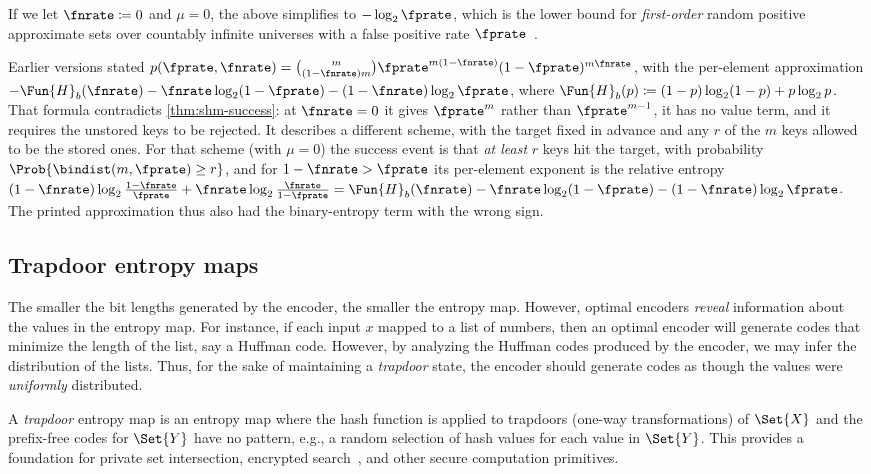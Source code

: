 \documentclass[ ../main.tex]{subfiles}
\begin{document}
If we let $\fnrate \coloneqq 0$ and $\mu = 0$, the above simplifies to
$-\log_2 \fprate$, which is the lower bound for \emph{first-order} random
positive approximate sets over countably infinite universes with a false
positive rate $\fprate$~\cite{carter1978}.

\begin{remark}
Earlier versions stated
$p(\fprate,\fnrate) = \binom{m}{(1-\fnrate)m} \fprate^{m(1-\fnrate)}
(1-\fprate)^{m \fnrate}$, with the per-element approximation
$-\Fun{H}_b(\fnrate) - \fnrate \log_2 (1-\fprate) - (1-\fnrate) \log_2 \fprate$,
where $\Fun{H}_b(p) \coloneqq (1-p)\log_2(1-p) + p \log_2 p$.
That formula contradicts \cref{thm:shm-success}: at $\fnrate = 0$ it gives
$\fprate^m$ rather than $\fprate^{m-1}$, it has no value term, and it requires
the unstored keys to be rejected.
It describes a different scheme, with the target fixed in advance and any $r$
of the $m$ keys allowed to be the stored ones.
For that scheme (with $\mu = 0$) the success event is that \emph{at least} $r$
keys hit the target, with probability $\Prob{\bindist(m,\fprate) \geq r}$, and
for $1 - \fnrate > \fprate$ its per-element exponent is the relative entropy
$(1-\fnrate)\log_2\frac{1-\fnrate}{\fprate} + \fnrate\log_2\frac{\fnrate}{1-\fprate}
= \Fun{H}_b(\fnrate) - \fnrate \log_2 (1-\fprate) - (1-\fnrate) \log_2 \fprate$.
The printed approximation thus also had the binary-entropy term with the
wrong sign.
\end{remark}

\subsection{Trapdoor entropy maps}
\label{sec:trapdoor}

The smaller the bit lengths generated by the encoder, the smaller the entropy map.
However, optimal encoders \emph{reveal} information about the values in the entropy map.
For instance, if each input $x$ mapped to a list of numbers, then an optimal encoder will generate codes that minimize the length of the list, say a Huffman code.
However, by analyzing the Huffman codes produced by the encoder, we may infer the distribution of the lists.
Thus, for the sake of maintaining a \emph{trapdoor} state, the encoder should generate codes as though the values were \emph{uniformly} distributed.

A \emph{trapdoor} entropy map is an entropy map where the hash function is
applied to trapdoors (one-way transformations) of $\Set{X}$ and the
prefix-free codes for $\Set{Y}$ have no pattern, e.g., a
random selection of hash values for each value in $\Set{Y}$. This
provides a foundation for private set intersection, encrypted search~\cite{songWagnerPerrig2000,curtmola2006}, and
other secure computation primitives.
\end{document}
